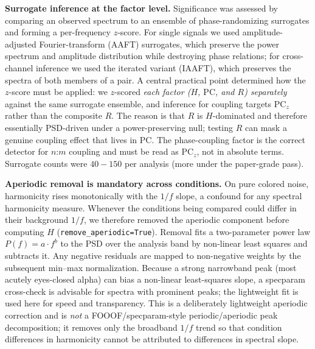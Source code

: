 \documentclass[11pt]{article}
\begin{document}
\textbf{Surrogate inference at the factor level.} Significance was assessed by comparing an observed spectrum to an ensemble of phase-randomizing surrogates and forming a per-frequency $z$-score. For single signals we used amplitude-adjusted Fourier-transform (AAFT) surrogates, which preserve the power spectrum and amplitude distribution while destroying phase relations; for cross-channel inference we used the iterated variant (IAAFT), which preserves the spectra of both members of a pair. A central practical point determined how the $z$-score must be applied: we $z$-scored \emph{each factor ($H$, $\mathrm{PC}$, and $R$) separately} against the same surrogate ensemble, and inference for coupling targets $\mathrm{PC}_z$ rather than the composite $R$. The reason is that $R$ is $H$-dominated and therefore essentially PSD-driven under a power-preserving null; testing $R$ can mask a genuine coupling effect that lives in $\mathrm{PC}$. The phase-coupling factor is the correct detector for $n$:$m$ coupling and must be read as $\mathrm{PC}_z$, not in absolute terms. Surrogate counts were $40-150$ per analysis (more under the paper-grade pass).

\textbf{Aperiodic removal is mandatory across conditions.} On pure colored noise, harmonicity rises monotonically with the $1/f$ slope, a confound for any spectral harmonicity measure. Whenever the conditions being compared could differ in their background $1/f$, we therefore removed the aperiodic component before computing $H$ (\texttt{remove\_aperiodic=True}). Removal fits a two-parameter power law $P(f) = a\cdot f^{b}$ to the PSD over the analysis band by non-linear least squares and subtracts it. Any negative residuals are mapped to non-negative weights by the subsequent min--max normalization. Because a strong narrowband peak (most acutely eyes-closed alpha) can bias a non-linear least-squares slope, a specparam cross-check is advisable for spectra with prominent peaks; the lightweight fit is used here for speed and transparency. This is a deliberately lightweight aperiodic correction and is \emph{not} a FOOOF/specparam-style periodic/aperiodic peak decomposition; it removes only the broadband $1/f$ trend so that condition differences in harmonicity cannot be attributed to differences in spectral slope.
\end{document}
